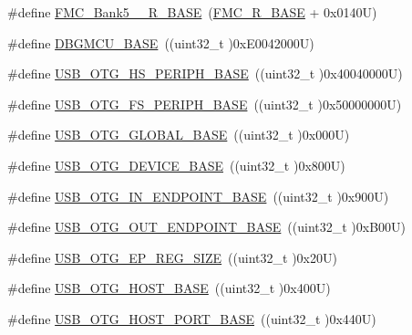\begin{DoxyCompactItemize}
\item 
\#define \hyperlink{group___peripheral__memory__map_gace117149a4fc0d07c38cc997fe4c4a73}{F\+M\+C\+\_\+\+Bank5\+\_\+\_\+\+R\+\_\+\+B\+A\+SE}~(\hyperlink{group___peripheral__memory__map_ga7a599164cd92798542bc6288793d1ed5}{F\+M\+C\+\_\+\+R\+\_\+\+B\+A\+SE} + 0x0140\+U)
\item 
\#define \hyperlink{group___peripheral__memory__map_ga4adaf4fd82ccc3a538f1f27a70cdbbef}{D\+B\+G\+M\+C\+U\+\_\+\+B\+A\+SE}~((uint32\+\_\+t )0x\+E0042000\+U)
\item 
\#define \hyperlink{group___peripheral__memory__map_gaa405d2ebfd7e9394237b6639f16a5409}{U\+S\+B\+\_\+\+O\+T\+G\+\_\+\+H\+S\+\_\+\+P\+E\+R\+I\+P\+H\+\_\+\+B\+A\+SE}~((uint32\+\_\+t )0x40040000\+U)
\item 
\#define \hyperlink{group___peripheral__memory__map_gaa86d4c80849a74938924e73937b904e7}{U\+S\+B\+\_\+\+O\+T\+G\+\_\+\+F\+S\+\_\+\+P\+E\+R\+I\+P\+H\+\_\+\+B\+A\+SE}~((uint32\+\_\+t )0x50000000\+U)
\item 
\#define \hyperlink{group___peripheral__memory__map_ga044aa4388e72d9d47a03f387fb8926fb}{U\+S\+B\+\_\+\+O\+T\+G\+\_\+\+G\+L\+O\+B\+A\+L\+\_\+\+B\+A\+SE}~((uint32\+\_\+t )0x000\+U)
\item 
\#define \hyperlink{group___peripheral__memory__map_ga4d74a337597a77b1fca978202b519a18}{U\+S\+B\+\_\+\+O\+T\+G\+\_\+\+D\+E\+V\+I\+C\+E\+\_\+\+B\+A\+SE}~((uint32\+\_\+t )0x800\+U)
\item 
\#define \hyperlink{group___peripheral__memory__map_gad8f69041452615aeb3948600e3882246}{U\+S\+B\+\_\+\+O\+T\+G\+\_\+\+I\+N\+\_\+\+E\+N\+D\+P\+O\+I\+N\+T\+\_\+\+B\+A\+SE}~((uint32\+\_\+t )0x900\+U)
\item 
\#define \hyperlink{group___peripheral__memory__map_gaf0e972b8f028ecf44a652029efbd4642}{U\+S\+B\+\_\+\+O\+T\+G\+\_\+\+O\+U\+T\+\_\+\+E\+N\+D\+P\+O\+I\+N\+T\+\_\+\+B\+A\+SE}~((uint32\+\_\+t )0x\+B00\+U)
\item 
\#define \hyperlink{group___peripheral__memory__map_ga6fdb7429ad88e2d69440d6ecc4f4199e}{U\+S\+B\+\_\+\+O\+T\+G\+\_\+\+E\+P\+\_\+\+R\+E\+G\+\_\+\+S\+I\+ZE}~((uint32\+\_\+t )0x20\+U)
\item 
\#define \hyperlink{group___peripheral__memory__map_ga3bb2dd6c82eefd8587b6146ba36ae071}{U\+S\+B\+\_\+\+O\+T\+G\+\_\+\+H\+O\+S\+T\+\_\+\+B\+A\+SE}~((uint32\+\_\+t )0x400\+U)
\item 
\#define \hyperlink{group___peripheral__memory__map_ga42f433cb79ca69f09972e690fda6737a}{U\+S\+B\+\_\+\+O\+T\+G\+\_\+\+H\+O\+S\+T\+\_\+\+P\+O\+R\+T\+\_\+\+B\+A\+SE}~((uint32\+\_\+t )0x440\+U)

\end{DoxyCompactItemize}
